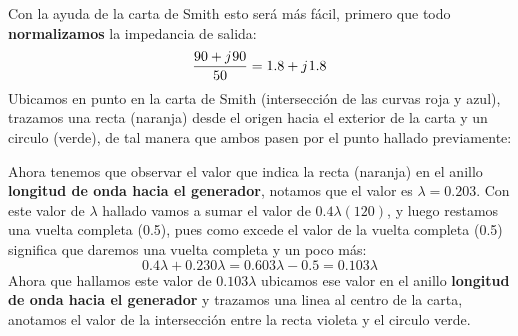 \documentclass[
	12pt, %
	fleqn, %
	a4paper, %
	oneside, %
]{LegrandOrangeBook}
\begin{document}
\begin{example}
Con la ayuda de la carta de Smith esto será más fácil, primero que todo \textbf{normalizamos} la impedancia de salida:
\begin{displaymath}
\frac{90+{j\mkern1mu} 90}{50}=1.8+{j\mkern1mu} 1.8
\end{displaymath}
Ubicamos en punto en la carta de Smith (intersección de las curvas roja y azul), trazamos una recta (naranja) desde el origen hacia el exterior de la carta  y un circulo (verde), de tal manera que ambos pasen por el punto hallado previamente:
\begin{center}
\end{center}
Ahora tenemos que observar el valor que indica la recta (naranja) en el anillo \textbf{longitud de onda hacia el generador}, notamos que el valor es $\lambda=0.203$. Con este valor de $\lambda$ hallado vamos a sumar el valor de $0.4\lambda(120)$, y luego restamos una vuelta completa (0.5), pues como excede el valor de la vuelta completa (0.5) significa que daremos una vuelta completa y un poco más:
\begin{displaymath}
0.4\lambda +0.230\lambda =0.603\lambda -0.5=0.103\lambda
\end{displaymath}
Ahora que hallamos este valor de $0.103\lambda$ ubicamos ese valor en el anillo \textbf{longitud de onda hacia el generador} y trazamos una linea al centro de la carta, anotamos el valor de la intersección entre la recta violeta y el circulo verde.
\begin{center}
\end{center}
\end{example}
\end{document}
